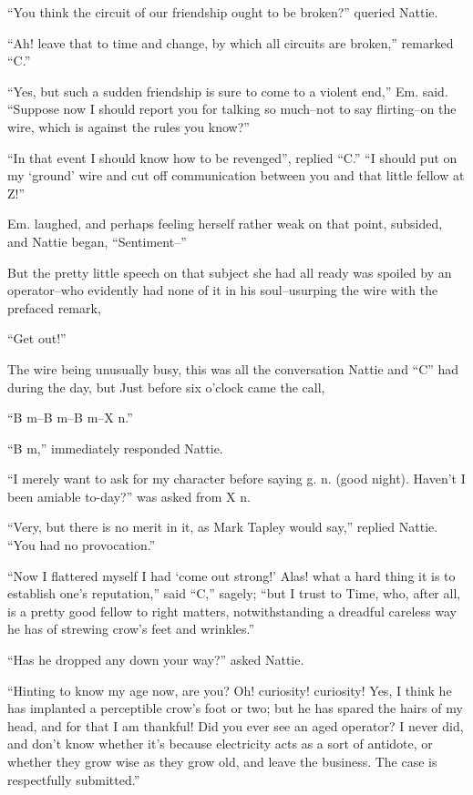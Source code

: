 ``You think the circuit of our friendship ought to be broken?'' queried
Nattie.

``Ah! leave that to time and change, by which all circuits are broken,''
remarked ``C.''

``Yes, but such a sudden friendship is sure to come to a violent end,''
Em. said. ``Suppose now I should report you for talking so much--not to
say flirting--on the wire, which is against the rules you know?''

``In that event I should know how to be revenged'', replied ``C.'' ``I should
put on my `ground' wire and cut off communication between you and that
little fellow at Z!''

Em. laughed, and perhaps feeling herself rather weak on that point,
subsided, and Nattie began, ``Sentiment--''

But the pretty little speech on that subject she had all ready was
spoiled by an operator--who evidently had none of it in his
soul--usurping the wire with the prefaced remark,

``Get out!''

The wire being unusually busy, this was all the conversation Nattie and
``C'' had during the day, but Just before six o'clock came the call,

``B m--B m--B m--X n.''

``B m,'' immediately responded Nattie.

``I merely want to ask for my character before saying g. n. (good night).
Haven't I been amiable to-day?'' was asked from X n.

``Very, but there is no merit in it, as Mark Tapley would say,'' replied
Nattie. ``You had no provocation.''

``Now I flattered myself I had `come out strong!' Alas! what a hard thing
it is to establish one's reputation,'' said ``C,'' sagely; ``but I trust to
Time, who, after all, is a pretty good fellow to right matters,
notwithstanding a dreadful careless way he has of strewing crow's feet
and wrinkles.''

``Has he dropped any down your way?'' asked Nattie.

``Hinting to know my age now, are you? Oh! curiosity! curiosity! Yes, I
think he has implanted a perceptible crow's foot or two; but he has
spared the hairs of my head, and for that I am thankful! Did you ever
see an aged operator? I never did, and don't know whether it's because
electricity acts as a sort of antidote, or whether they grow wise as
they grow old, and leave the business. The case is respectfully
submitted.''

